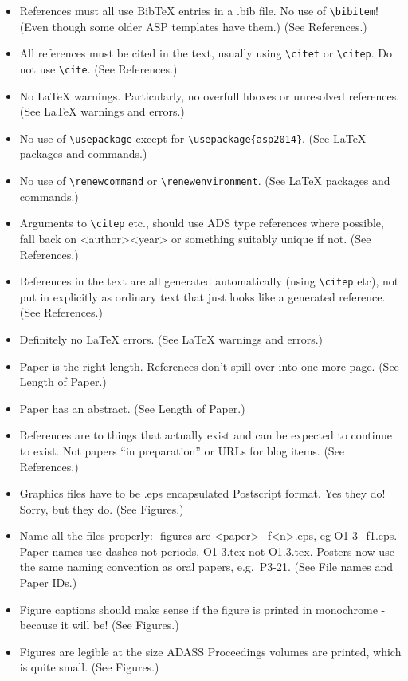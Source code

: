 \documentclass[11pt,twoside]{article}
\begin{document}
\begin{itemize}
\checklistitemize

\item References must all use BibTeX entries in a .bib file. No use of \verb"\bibitem"! (Even though some older ASP templates have them.) (See References.)
\item All references must be cited in the text, usually using \verb"\citet" or \verb"\citep".  Do not use \verb"\cite". (See References.)
\item No LaTeX warnings. Particularly, no overfull hboxes or unresolved references. (See LaTeX warnings and errors.)
\item No use of \verb"\usepackage" except for \verb"\usepackage{asp2014}". (See LaTeX packages and commands.)
\item No use of \verb"\renewcommand" or \verb"\renewenvironment". (See LaTeX packages and commands.)
\item Arguments to \verb"\citep" etc., should use ADS type references where possible, fall back on <author><year> or something suitably unique if not. (See References.)
\item References in the text are all generated automatically (using \verb"\citep" etc), not put in explicitly as ordinary text that just looks like a generated reference. (See References.)
\item Definitely no LaTeX errors. (See LaTeX warnings and errors.)
\item Paper is the right length. References don't spill over into one more page. (See Length of Paper.)
\item Paper has an abstract. (See Length of Paper.)
\item References are to things that actually exist and can be expected to continue to exist. Not papers ``in preparation'' or URLs for blog items. (See References.)
\item Graphics files have to be .eps encapsulated Postscript format. Yes they do! Sorry, but they do. (See Figures.)
\item Name all the files properly:- figures are <paper>\_f<n>.eps, eg O1-3\_f1.eps. Paper names use dashes not periods, O1-3.tex not O1.3.tex. Posters now use the same naming convention as oral papers, e.g.\ P3-21. (See File names and Paper IDs.)
\item Figure captions should make sense if the figure is printed in monochrome - because it will be! (See Figures.)
\item Figures are legible at the size ADASS Proceedings volumes are printed, which is quite small. (See Figures.)

\end{itemize}
\end{document}
